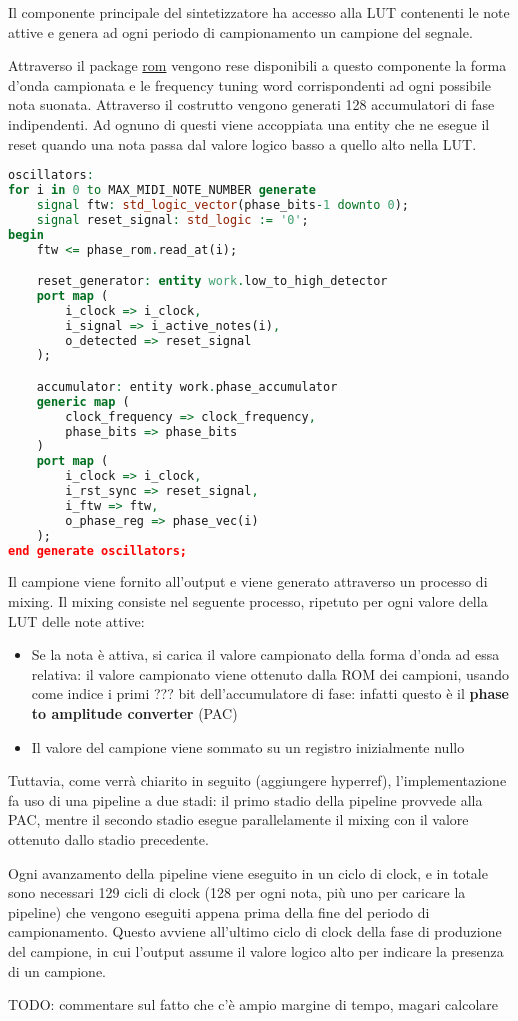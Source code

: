 Il componente principale del sintetizzatore ha accesso alla LUT contenenti le note attive e genera ad ogni periodo di campionamento
un campione del segnale.

Attraverso il package \hyperref[sec:rom]{rom} vengono rese disponibili a questo componente la forma d'onda campionata e le frequency
tuning word corrispondenti ad ogni possibile nota suonata.
Attraverso il costrutto  vengono generati 128 accumulatori di fase indipendenti. Ad ognuno di questi viene accoppiata
una entity che ne esegue il reset quando una nota passa dal valore logico basso a quello alto nella LUT.
\begin{lstlisting}[language=VHDL]
oscillators:
for i in 0 to MAX_MIDI_NOTE_NUMBER generate
    signal ftw: std_logic_vector(phase_bits-1 downto 0);
    signal reset_signal: std_logic := '0';
begin
    ftw <= phase_rom.read_at(i);

    reset_generator: entity work.low_to_high_detector
    port map (
        i_clock => i_clock,
        i_signal => i_active_notes(i),
        o_detected => reset_signal
    );

    accumulator: entity work.phase_accumulator
    generic map (
        clock_frequency => clock_frequency,
        phase_bits => phase_bits
    )
    port map (
        i_clock => i_clock,
        i_rst_sync => reset_signal,
        i_ftw => ftw,
        o_phase_reg => phase_vec(i)
    );
end generate oscillators;
\end{lstlisting}

Il campione viene fornito all'output  e viene generato attraverso un processo di mixing.
Il mixing consiste nel seguente processo, ripetuto per ogni valore della LUT delle note attive:
\begin{itemize}
    \item Se la nota è attiva, si carica il valore campionato della forma d'onda ad essa relativa:
          il valore campionato viene ottenuto dalla ROM dei campioni, usando come indice
          i primi ??? bit dell'accumulatore di fase: infatti questo è il
          \textbf{phase to amplitude converter} (PAC)
    \item Il valore del campione viene sommato su un registro inizialmente nullo
\end{itemize} 

Tuttavia, come verrà chiarito in seguito (aggiungere hyperref),
l'implementazione fa uso di una pipeline a due stadi:
il primo stadio della pipeline provvede alla PAC, mentre il secondo stadio
esegue parallelamente il mixing con il valore ottenuto dallo stadio
precedente.

Ogni avanzamento della pipeline viene eseguito in un ciclo di clock,
e in totale sono necessari 129 cicli di clock
(128 per ogni nota, più uno per caricare la pipeline) che vengono eseguiti
appena prima della fine del periodo di campionamento.
Questo avviene all'ultimo ciclo di clock della fase di produzione del
campione, in cui l'output  assume il valore
logico alto per indicare la presenza di un campione.

TODO: commentare sul fatto che c'è ampio margine di tempo, magari calcolare

